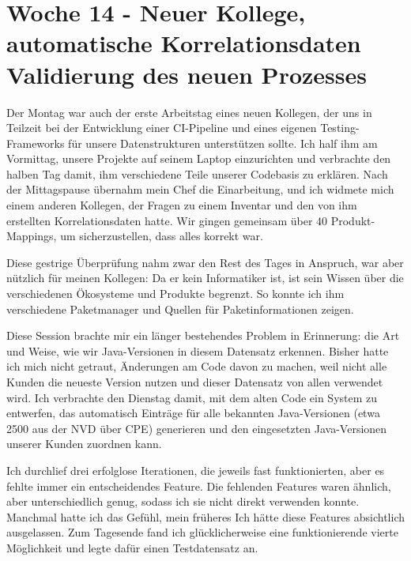 \section{Woche 14 - Neuer Kollege, automatische Korrelationsdaten \headerand Validierung des neuen Prozesses} \label{sec:bericht-wo-14-initial}


\lweekdaymarginpar{\weekdayMondayLong}

Der Montag war auch der erste Arbeitstag eines neuen Kollegen, der uns in Teilzeit bei der Entwicklung einer CI-Pipeline und eines eigenen Testing-Frameworks für unsere Datenstrukturen unterstützen sollte.
Ich half ihm am Vormittag, unsere Projekte auf seinem Laptop einzurichten und verbrachte den halben Tag damit, ihm verschiedene Teile unserer Codebasis zu erklären.
Nach der Mittagspause übernahm mein Chef die Einarbeitung, und ich widmete mich einem anderen Kollegen, der Fragen zu einem Inventar und den von ihm erstellten Korrelationsdaten hatte.
Wir gingen gemeinsam über 40 Produkt-Mappings, um sicherzustellen, dass alles korrekt war.

Diese gestrige Überprüfung nahm zwar den Rest des Tages in Anspruch, war aber nützlich für meinen Kollegen:
Da er kein Informatiker ist, ist sein Wissen über die verschiedenen Ökosysteme und  Produkte begrenzt.
So konnte ich ihm verschiedene Paketmanager und Quellen für Paketinformationen zeigen.

\sweekdaymarginpar{\weekdayTuesdayLong}

Diese Session brachte mir ein länger bestehendes Problem in Erinnerung: die Art und Weise, wie wir Java-Versionen in diesem Datensatz erkennen.
Bisher hatte ich mich nicht getraut, Änderungen am Code davon zu machen, weil nicht alle Kunden die neueste Version nutzen und dieser Datensatz von allen verwendet wird.
Ich verbrachte den Dienstag damit, mit dem alten Code ein System zu entwerfen, das automatisch Einträge für alle bekannten Java-Versionen (etwa 2500 aus der NVD über CPE) generieren und den eingesetzten Java-Versionen unserer Kunden zuordnen kann.

Ich durchlief drei erfolglose Iterationen, die jeweils fast funktionierten, aber es fehlte immer ein entscheidendes Feature.
Die fehlenden Features waren ähnlich, aber unterschiedlich genug, sodass ich sie nicht direkt verwenden konnte.
Manchmal hatte ich das Gefühl, mein früheres Ich hätte diese Features absichtlich ausgelassen.
Zum Tagesende fand ich glücklicherweise eine funktionierende vierte Möglichkeit und legte dafür einen Testdatensatz an.


